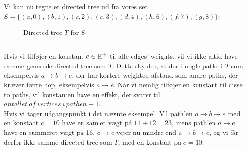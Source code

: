 \documentclass[a4paper,12pt]{article}
\begin{document}
Vi kan nu tegne et directed tree ud fra vores set $S = \{(a,0),(b,1),(c,2),(e,3),(d,4),(h,6),(f,7),(g,8)\}$:
\begin{figure}[H]
    \centering
    \caption{Directed tree $T$ for $S$}
\end{figure}

\subsection[]{}

Hvis vi tilføjer en konstant $c \in \mathbb{R}^+$ til alle edges' weights, vil vi ikke altid have samme generede directed tree som $T$. Dette skyldes, at der i nogle paths i $T$ som eksempelvis $a\rightarrow b \rightarrow e$, der har kortere weighted afstand som andre paths, der kræver færre hop, eksempelvis $a \rightarrow e$. Når vi nemlig tilføjer en konstant til disse to paths, vil konstanten have en effekt, der svarer til $antallet \ af \ vertices\ i \ pathen - 1$.\\
Hvis vi tager udgangspunkt i det nævnte eksempel. Vil path'en $a\rightarrow b\rightarrow e$ med en konstant $c = 10$ have en samlet vægt på $11 + 12 = 23$, mens path'en $a\rightarrow e$ have en summeret vægt på 16. $a\rightarrow e$ vejer nu mindre end $a\rightarrow b \rightarrow e$, og vi får derfor ikke samme directed tree som $T$, med en konstant på $c = 10$.

\subsection[]{}
\end{document}
